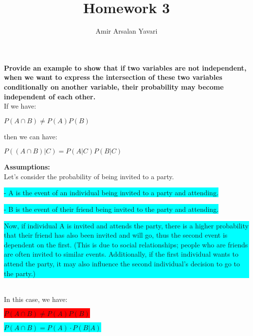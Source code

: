 \documentclass[12pt]{article}
\begin{document}
 
 
\title{Homework 3}
\author{Amir Arsalan Yavari}
\maketitle

\textbf{Provide an example to show that if two variables are not independent, when we want to express the intersection of these two variables conditionally on another variable, their probability may become independent of each other.}\\[10pt]

If we have:
\begin{center}
$P(A \cap B) \neq P(A)P(B)$
\end{center}

then we can have:
\begin{center}
$P((A \cap B) | C) = P(A | C) P(B | C)$\\[7pt]
\end{center}

\textbf{Assumptions:}
\\

Let's consider the probability of being invited to a party.  

\colorbox{cyan}{- A is the event of an individual being invited to a party and attending.} 

\colorbox{cyan}{- B is the event of their friend being invited to the party and attending.}
\\

\colorbox{cyan}{\begin{minipage}{\textwidth}
Now, if individual A is invited and attends the party, there is a higher probability that their friend has also been invited and will go, thus the second event is dependent on the first. (This is due to social relationships; people who are friends are often invited to similar events. Additionally, if the first individual wants to attend the party, it may also influence the second individual's decision to go to the party.)
\end{minipage}}
\\

In this case, we have:  

\begin{center}
    \colorbox{red}{\( P(A \cap B) \neq P(A)P(B) \)}

    \colorbox{cyan}{\( P(A \cap B) = P(A) \cdot P(B|A) \)}
\end{center}
\end{document}
